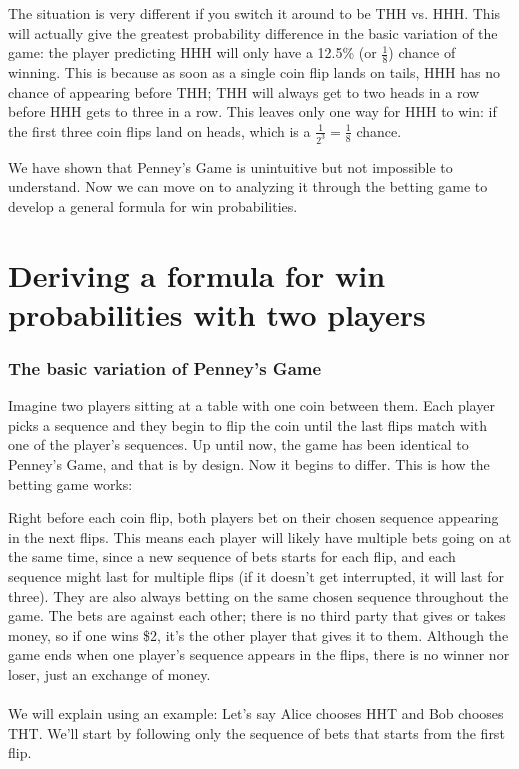 \documentclass[english,12pt,a4paper,final]{article}
\begin{document}
The situation is very different if you switch it around to be THH vs. HHH. This will actually give the greatest probability difference in the basic variation of the game: the player predicting HHH will only have a 12.5\% (or $\frac{1}{8}$) chance of winning. This is because as soon as a single coin flip lands on tails, HHH has no chance of appearing before THH; THH will always get to two heads in a row before HHH gets to three in a row. This leaves only one way for HHH to win: if the first three coin flips land on heads, which is a $\frac{1}{2^3} = \frac{1}{8}$ chance.

We have shown that Penney's Game is unintuitive but not impossible to understand. Now we can move on to analyzing it through the betting game to develop a general formula for win probabilities.

\part{Deriving a formula for win probabilities with two players}\label{derivingFormula2P}

\section{The basic variation of Penney's Game}

Imagine two players sitting at a table with one coin between them. Each player picks a sequence and they begin to flip the coin until the last flips match with one of the player's sequences. Up until now, the game has been identical to Penney's Game, and that is by design. Now it begins to differ. This is how the betting game works:

Right before each coin flip, both players bet on their chosen sequence appearing in the next flips. This means each player will likely have multiple bets going on at the same time, since a new sequence of bets starts for each flip, and each sequence might last for multiple flips (if it doesn't get interrupted, it will last for three). They are also always betting on the same chosen sequence throughout the game. The bets are against each other; there is no third party that gives or takes money, so if one wins \$2, it's the other player that gives it to them. Although the game ends when one player's sequence appears in the flips, there is no winner nor loser, just an exchange of money.
\\\\
We will explain using an example: Let's say Alice chooses HHT and Bob chooses THT. We'll start by following only the sequence of bets that starts from the first flip. 
\end{document}

